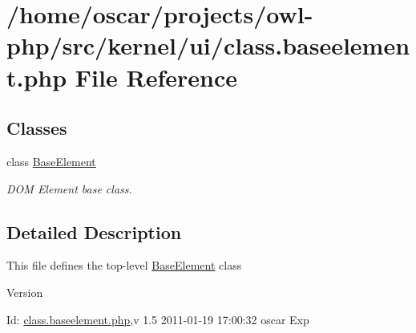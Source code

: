 \section{/home/oscar/projects/owl-\/php/src/kernel/ui/class.baseelement.php File Reference}
\label{class_8baseelement_8php}
\subsection*{Classes}
\begin{DoxyCompactItemize}
\item 
class \hyperlink{classBaseElement}{BaseElement}
\begin{DoxyCompactList}\small\item\em DOM Element base class. \item\end{DoxyCompactList}\end{DoxyCompactItemize}


\subsection{Detailed Description}
This file defines the top-\/level \hyperlink{classBaseElement}{BaseElement} class \begin{DoxyVersion}{Version}

\end{DoxyVersion}
\begin{DoxyParagraph}{Id:}
\hyperlink{class_8baseelement_8php}{class.baseelement.php},v 1.5 2011-\/01-\/19 17:00:32 oscar Exp 
\end{DoxyParagraph}

